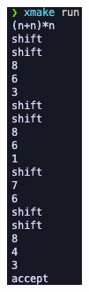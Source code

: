 \begin{figure}[htbp]
    \centering
    \begin{minipage}[t]{0.2\textwidth}
        \centering
        \includegraphics[width=\textwidth]{images/lr_4.png}

\end{minipage}
\end{figure}
